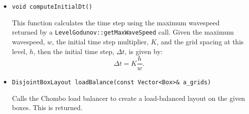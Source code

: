 \begin{itemize}
\item \begin{small} \begin{verbatim}
void computeInitialDt()
\end{verbatim}\end{small}
This function calculates the time step using the maximum wavespeed returned
by a \verb/LevelGodunov::getMaxWaveSpeed/ call.  Given the maximum wavespeed,
$w$, the initial time step multiplier, $K$, and the grid spacing at this
level, $h$, then the initial time step, $\Delta t$, is given by:
\begin{equation}
\Delta t= K \frac{h}{w}.
\end{equation}

\item \begin{small} \begin{verbatim}
DisjointBoxLayout loadBalance(const Vector<Box>& a_grids)
\end{verbatim}\end{small}
Calls the Chombo load balancer to create a load-balanced layout
on the given boxes.  This is returned.
\end{itemize}

